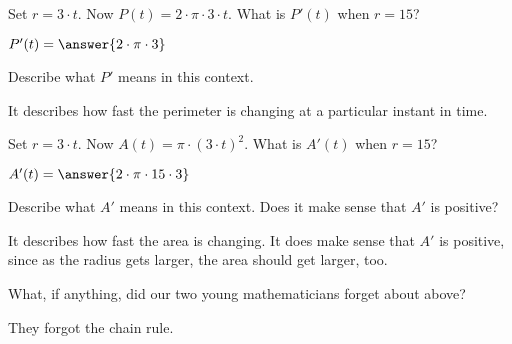 \documentclass{ximera}
\begin{document}
\begin{problem}
  Set $r=3\cdot t$. Now $P(t) = 2\cdot \pi\cdot 3\cdot t$. What is
  $P'(t)$ when $r=15$?
  \begin{prompt}
    $P'(t)=\answer{2\cdot \pi\cdot 3}$
  \end{prompt}
\end{problem}

\begin{problem}
  Describe what $P'$ means in this context.
  \begin{freeResponse}
    It describes how fast the perimeter is changing at a particular
    instant in time.
  \end{freeResponse}
\end{problem}

\begin{problem}
  Set $r=3\cdot t$. Now $A(t) = \pi\cdot (3\cdot t)^2$. What is
  $A'(t)$ when $r=15$?
  \begin{prompt}
    $A'(t)=\answer{2\cdot\pi\cdot 15\cdot 3}$
  \end{prompt}
\end{problem}

\begin{problem}
  Describe what $A'$ means in this context.  Does it make sense that
  $A'$ is positive?
  \begin{freeResponse}
    It describes how fast the area is changing.  It does make sense that
    $A'$ is positive, since as the radius gets larger, the area should
    get larger, too.
  \end{freeResponse}
\end{problem}

\begin{problem}
  What, if anything, did our two young mathematicians forget about above?
  \begin{freeResponse}
 They forgot the chain rule.
  \end{freeResponse}
\end{problem}


\end{document}
